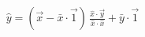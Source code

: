 \documentclass[preview]{standalone}
\begin{document}
\begin{align*}
\hat{y} =  ( \overrightarrow{x} - \bar{x} \cdot \overrightarrow{1} )\, \frac{\hat{x}\cdot\overrightarrow{y}}{\hat{x}\cdot\hat{x}} + \bar{y} \cdot \overrightarrow{1}
\end{align*}
\end{document}
